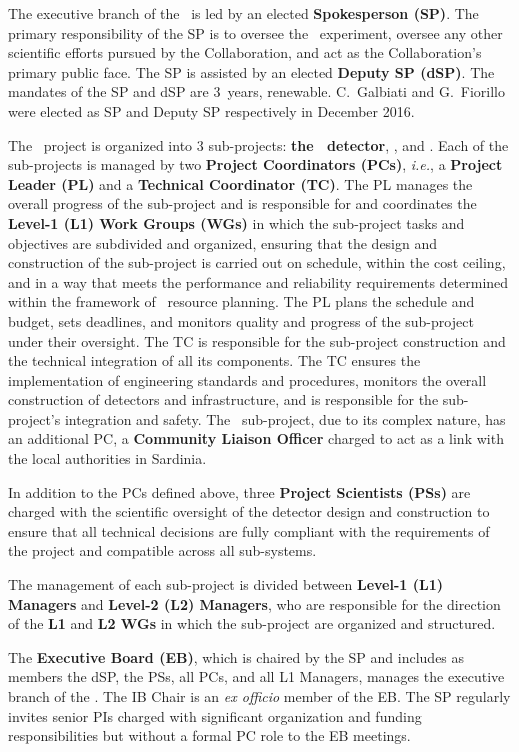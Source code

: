 The executive branch of the \GADMC\ is led by an elected {\bf Spokesperson (SP)}.  The primary responsibility of the SP is to oversee the \DSks\ experiment, oversee any other scientific efforts pursued by the Collaboration, and act as the Collaboration's primary public face.  The SP is assisted by an elected {\bf Deputy SP (dSP)}.  The mandates of the SP and dSP are \num{3}~years, renewable.  C.~Galbiati and G.~Fiorillo were elected as SP and Deputy SP respectively in December 2016.

The \DSk\ project is organized into \num{3} sub-projects: {\bf the \DSks\ detector}, {\bf \Urania}, and {\bf \Aria}. Each of the sub-projects is managed by two {\bf Project Coordinators (PCs)}, {\it i.e.}, a {\bf Project Leader (PL)} and a {\bf Technical Coordinator (TC)}.  The PL manages the overall progress of the sub-project and is responsible for and coordinates the {\bf Level-1 (L1) Work Groups (WGs)} in which the sub-project tasks and objectives are subdivided and organized, ensuring that the design and construction of the sub-project is carried out on schedule, within the cost ceiling, and in a way that meets the performance and reliability requirements determined within the framework of \GADMC\ resource planning.  The PL plans the schedule and budget, sets deadlines, and monitors quality and progress of the sub-project under their oversight.  The TC is responsible for the sub-project construction and the technical integration of all its components. The TC ensures the implementation of engineering standards and procedures, monitors the overall construction of detectors and infrastructure, and is responsible for the sub-project's integration and safety. The \Aria\ sub-project, due to its complex nature, has an additional PC, a {\bf Community Liaison Officer} charged to act as a link with the local authorities in Sardinia.

In addition to the PCs defined above, three {\bf Project Scientists (PSs)} are charged with the scientific oversight of the detector design and construction to ensure that all technical decisions are fully compliant with the requirements of the project and compatible across all sub-systems.

The management of each sub-project is divided between {\bf Level-1 (L1) Managers} and {\bf Level-2 (L2) Managers}, who are responsible for the direction of the {\bf L1} and {\bf L2 WGs} in which the sub-project are organized and structured.

The {\bf Executive Board (EB)}, which is chaired by the SP and includes as members the dSP, the PSs, all PCs, and all L1 Managers, manages the executive branch of the \GADMC.  The IB Chair is an {\it ex officio} member of the EB.  The SP regularly invites senior PIs charged with significant organization and funding responsibilities but without a formal PC role to the EB meetings.

